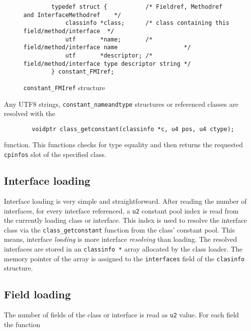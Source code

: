 \begin{itemize}
 \endgroup

\begin{figure}[h]
\begin{verbatim}
        typedef struct {           /* Fieldref, Methodref and InterfaceMethodref    */
            classinfo *class;      /* class containing this field/method/interface  */
            utf       *name;       /* field/method/interface name                   */
            utf       *descriptor; /* field/method/interface type descriptor string */
        } constant_FMIref;
\end{verbatim}
\caption{\texttt{constant\_FMIref} structure}
\label{constantFMIref}
\end{figure}

\end{itemize}

Any UTF8 strings, \texttt{constant\_nameandtype} structures or
referenced classes are resolved with the

\begin{verbatim}
        voidptr class_getconstant(classinfo *c, u4 pos, u4 ctype);
\end{verbatim}

function. This functions checks for type equality and then returns the
requested \texttt{cpinfos} slot of the specified class.


\subsection{Interface loading}

Interface loading is very simple and straightforward. After reading
the number of interfaces, for every interface referenced, a
\texttt{u2} constant pool index is read from the currently loading
class or interface. This index is used to resolve the interface class
via the \texttt{class\_getconstant} function from the class' constant
pool. This means, interface \textit{loading} is more interface
\textit{resolving} than loading. The resolved interfaces are stored
in an \texttt{classinfo *} array allocated by the class loader. The
memory pointer of the array is assigned to the \texttt{interfaces}
field of the \texttt{clasinfo} structure.


\subsection{Field loading}

The number of fields of the class or interface is read as \texttt{u2}
value. For each field the function

